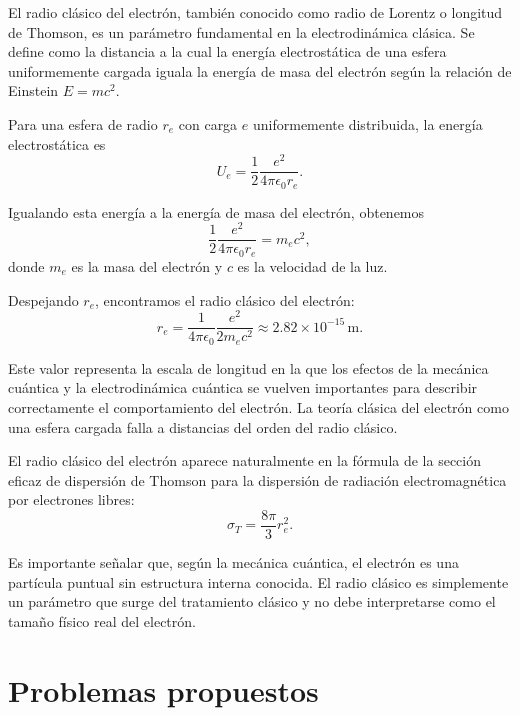 \documentclass[12pt,a4paper]{book}
\begin{document}
El radio clásico del electrón, también conocido como radio de Lorentz o longitud de Thomson, es un parámetro fundamental en la electrodinámica clásica. Se define como la distancia a la cual la energía electrostática de una esfera uniformemente cargada iguala la energía de masa del electrón según la relación de Einstein $E = mc^2$.

Para una esfera de radio $r_e$ con carga $e$ uniformemente distribuida, la energía electrostática es
\begin{equation}
U_e = \frac{1}{2} \frac{e^2}{4\pi\epsilon_0 r_e}.
\end{equation}

Igualando esta energía a la energía de masa del electrón, obtenemos
\begin{equation}
\frac{1}{2} \frac{e^2}{4\pi\epsilon_0 r_e} = m_e c^2,
\end{equation}
donde $m_e$ es la masa del electrón y $c$ es la velocidad de la luz.

Despejando $r_e$, encontramos el radio clásico del electrón:
\begin{equation}
r_e = \frac{1}{4\pi\epsilon_0} \frac{e^2}{2m_e c^2} \approx 2.82 \times 10^{-15} \, \textrm{m}.
\end{equation}

Este valor representa la escala de longitud en la que los efectos de la mecánica cuántica y la electrodinámica cuántica se vuelven importantes para describir correctamente el comportamiento del electrón. La teoría clásica del electrón como una esfera cargada falla a distancias del orden del radio clásico.

El radio clásico del electrón aparece naturalmente en la fórmula de la sección eficaz de dispersión de Thomson para la dispersión de radiación electromagnética por electrones libres:
\begin{equation}
\sigma_T = \frac{8\pi}{3} r_e^2.
\end{equation}

Es importante señalar que, según la mecánica cuántica, el electrón es una partícula puntual sin estructura interna conocida. El radio clásico es simplemente un parámetro que surge del tratamiento clásico y no debe interpretarse como el tamaño físico real del electrón.

\section{Problemas propuestos}
\end{document}
